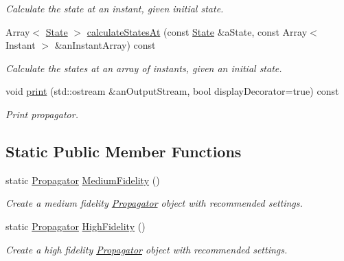 \begin{DoxyCompactItemize}
\begin{DoxyCompactList}\small\item\em Calculate the state at an instant, given initial state. \end{DoxyCompactList}\item 
Array$<$ \hyperlink{classostk_1_1astro_1_1trajectory_1_1_state}{State} $>$ \hyperlink{classostk_1_1astro_1_1trajectory_1_1_propagator_af61cfbdfeff89b32300f36c4346beee1}{calculate\+States\+At} (const \hyperlink{classostk_1_1astro_1_1trajectory_1_1_state}{State} \&a\+State, const Array$<$ Instant $>$ \&an\+Instant\+Array) const
\begin{DoxyCompactList}\small\item\em Calculate the states at an array of instants, given an initial state. \end{DoxyCompactList}\item 
void \hyperlink{classostk_1_1astro_1_1trajectory_1_1_propagator_afcd15a80e95284363dc51270db0777d6}{print} (std\+::ostream \&an\+Output\+Stream, bool display\+Decorator=true) const
\begin{DoxyCompactList}\small\item\em Print propagator. \end{DoxyCompactList}\end{DoxyCompactItemize}
\subsection*{Static Public Member Functions}
\begin{DoxyCompactItemize}
\item 
static \hyperlink{classostk_1_1astro_1_1trajectory_1_1_propagator}{Propagator} \hyperlink{classostk_1_1astro_1_1trajectory_1_1_propagator_a8d807b90b10f02edb732afe28dca0c04}{Medium\+Fidelity} ()
\begin{DoxyCompactList}\small\item\em Create a medium fidelity \hyperlink{classostk_1_1astro_1_1trajectory_1_1_propagator}{Propagator} object with recommended settings. \end{DoxyCompactList}\item 
static \hyperlink{classostk_1_1astro_1_1trajectory_1_1_propagator}{Propagator} \hyperlink{classostk_1_1astro_1_1trajectory_1_1_propagator_ae49a22d28386d71da700c80b9a766983}{High\+Fidelity} ()
\begin{DoxyCompactList}\small\item\em Create a high fidelity \hyperlink{classostk_1_1astro_1_1trajectory_1_1_propagator}{Propagator} object with recommended settings. \end{DoxyCompactList}\end{DoxyCompactItemize}
